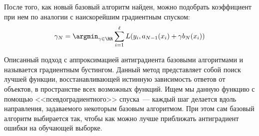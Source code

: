 \documentclass[12pt,fleqn]{article}
\begin{document}
После того, как новый базовый алгоритм найден, можно подобрать коэффициент при нем
по аналогии с наискорейшим градиентным спуском:
\[
    \gamma_N
    =
    \argmin_{\gamma \in \RR}
    \sum_{i = 1}^{\ell}
        L(y_i, a_{N - 1}(x_i) + \gamma b_N(x_i))
\]

Описанный подход с аппроксимацией антиградиента базовыми алгоритмами
и называется градиентным бустингом.
Данный метод представляет собой поиск лучшей функции, восстанавливающей истинную зависимость
ответов от объектов, в пространстве всех возможных функций.
Ищем мы данную функцию с помощью <<псевдоградиентного>> спуска~---
каждый шаг делается вдоль направления, задаваемого некоторым базовым алгоритмом.
При этом сам базовый алгоритм выбирается так, чтобы как можно лучше приближать
антиградиент ошибки на обучающей выборке.




\end{document}
